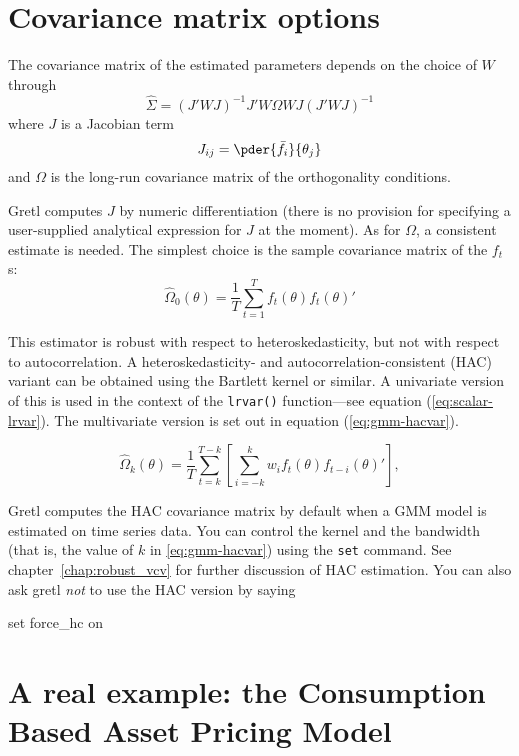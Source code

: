 \section{Covariance matrix options}
\label{sec:gmm-vcv}

The covariance matrix of the estimated parameters depends on the
choice of $W$ through
\begin{equation}
  \label{eq:gmmest-vcv}
    \hat{\Sigma} = (J'WJ)^{-1} J'W\Omega W J (J'WJ)^{-1}
\end{equation}
where $J$ is a Jacobian term
\[
  J_{ij} = \pder{\bar{f}_i}{\theta_j}
\]
and $\Omega$ is the long-run covariance matrix of the orthogonality
conditions. 

Gretl computes $J$ by numeric differentiation (there is no
provision for specifying a user-supplied analytical expression for $J$
at the moment). As for $\Omega$, a consistent estimate is needed. The
simplest choice is the sample covariance matrix of the $f_t$s:
\begin{equation}
  \label{eq:gmm-hcvar}
    \hat{\Omega}_0(\theta) = \frac{1}{T} \sum_{t=1}^T f_t(\theta) f_t(\theta)'
\end{equation}

This estimator is robust with respect to heteroskedasticity, but not
with respect to autocorrelation.  A heteroskedasticity- and
autocorrelation-consistent (HAC) variant can be obtained using the
Bartlett kernel or similar.  A univariate version of this is used in
the context of the \texttt{lrvar()} function---see equation
(\ref{eq:scalar-lrvar}).  The multivariate version is set out in
equation (\ref{eq:gmm-hacvar}).

\begin{equation}
  \label{eq:gmm-hacvar}
    \hat{\Omega}_k(\theta) = \frac{1}{T} 
    \sum_{t=k}^{T-k} \left[ \sum_{i=-k}^k w_i f_t(\theta) f_{t-i}(\theta)'  \right] ,
\end{equation}

Gretl computes the HAC covariance matrix by default when a GMM
model is estimated on time series data.  You can control the kernel
and the bandwidth (that is, the value of $k$ in \ref{eq:gmm-hacvar})
using the \texttt{set} command.  See chapter~\ref{chap:robust_vcv} for
further discussion of HAC estimation.  You can also ask gretl
\emph{not} to use the HAC version by saying
%
\begin{code}
set force_hc on
\end{code}
%


\section{A real example: the Consumption Based Asset Pricing Model}
\label{sec:gmm-CBAPM}

